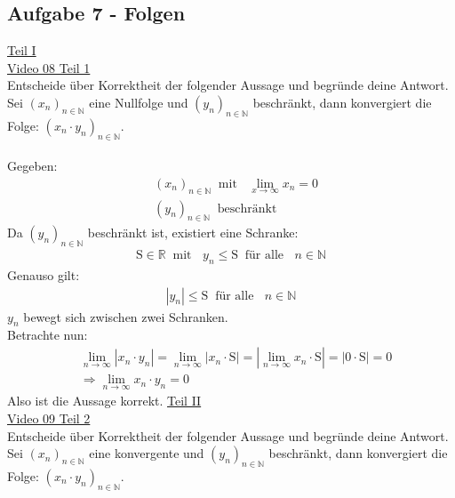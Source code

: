 \subsection{Aufgabe 7 - Folgen }
\underline{Teil I}\\
\href{https://youtu.be/WVkBwJisfwI}{Video 08 Teil 1}\\
Entscheide über Korrektheit der folgender Aussage und begründe deine Antwort.\\
Sei $ (x_n)_{n\in\mathbb{N}} $ eine Nullfolge und $ (y_n)_{n\in\mathbb{N}} $ beschränkt, dann konvergiert die Folge: $ (x_n\cdot y_n)_{n\in\mathbb{N}} $.\\
\\
Gegeben:\\
\begin{align*}
&(x_n)_{n\in\mathbb{N}}\;\;\text{mit }\;\;\lim\limits_ {x\to\infty}x_n=0\\
&(y_n)_{n\in\mathbb{N}}\;\;\text{beschränkt }
\end{align*}
Da $ (y_n)_{n\in\mathbb{N}} $ beschränkt ist, existiert eine Schranke:\\
\begin{align*}
\mathrm{S}\in \mathbb{R}\;\;\text{mit }\;\;y_n\leq \mathrm{S}\;\;\text{für alle }\;\;n\in\mathbb{N}
\end{align*}
Genauso gilt:\\
\begin{align*}
|y_n|\leq \mathrm{S}\;\;\text{für alle }\;\;n\in\mathbb{N}
\end{align*}
$ y_n $ bewegt sich zwischen zwei Schranken.\\
Betrachte nun:\\
\begin{align*}
&\lim\limits_ {n\to\infty}|x_n\cdot y_n|=\lim\limits_ {n\to\infty}|x_n\cdot \mathrm{S}|=|\lim\limits_ {n\to\infty} x_n\cdot \mathrm{S}|=|0\cdot \mathrm{S}|=0\\
&\Rightarrow \lim\limits_ {n\to\infty}x_n\cdot y_n=0
\end{align*}
Also ist die Aussage korrekt.
\newpage
\noindent
\underline{Teil II}\\
\href{https://youtu.be/gXJcu4IlP0k}{Video 09 Teil 2}\\
Entscheide über Korrektheit der folgender Aussage und begründe deine Antwort.\\
Sei $ (x_n)_{n\in\mathbb{N}} $ eine konvergente  und $ (y_n)_{n\in\mathbb{N}} $ beschränkt, dann konvergiert die Folge: $ (x_n\cdot y_n)_{n\in\mathbb{N}} $.\\
